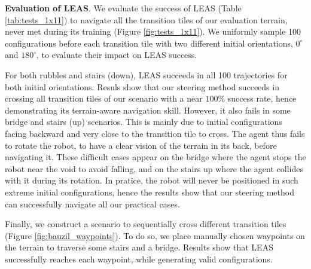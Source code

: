 
\hfill

\noindent\textbf{Evaluation of LEAS}. We evaluate the success of LEAS (Table \ref{tab:tests_1x11}) to navigate all the transition tiles of our evaluation terrain, never met during its training (Figure \ref{fig:tests_1x11}).
We uniformly sample 100 configurations before each transition tile with two different initial orientations, $0^{\circ}$ and $180^{\circ}$, to evaluate their impact on LEAS success. 


For both rubbles and stairs (down), LEAS succeeds in all 100 trajectories for both initial orientations.
Resuls show that our steering method succeeds in crossing all transition tiles of our scenario with a near $100$\% success rate, hence demonstrating its terrain-aware navigation skill.
However, it also fails in some bridge and stairs (up) scenarios. This is mainly due to initial configurations facing backward and very close to the transition tile to cross. 
The agent thus fails to rotate the robot, to have a clear vision of the terrain in its back, before navigating it. 
These difficult cases appear on the bridge where the agent stops the robot near the void to avoid falling, and on the stairs up where the agent collides with it during its rotation.
In pratice, the robot will never be positioned in such extreme initial configurations, hence the results show that our steering method can successfully navigate all our practical cases.



Finally, we construct a scenario to sequentially cross different transition tiles (Figure \ref{fig:bauzil_waypoints}). To do so, we place manually chosen waypoints on the terrain to traverse some stairs and a bridge.
Results show that LEAS successfully reaches each waypoint, while generating valid configurations.

